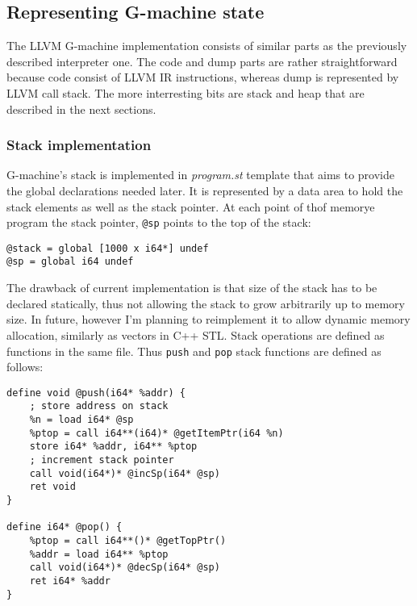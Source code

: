 \documentclass[12pt,a4paper]{report}
\begin{document}
\subsection{Representing G-machine state}
The LLVM G-machine implementation consists of similar parts as the previously
described interpreter one. The code and dump parts are rather straightforward
because code consist of LLVM IR instructions, whereas dump is represented by
LLVM call stack. The more interresting bits are stack and heap that are
described in the next sections.

\subsubsection{Stack implementation}
G-machine's stack is implemented in \textit{program.st}
template that aims to provide the global declarations needed later. It is
represented by a data area to hold the stack elements as well as the stack
pointer. At each point of thof memorye program the stack pointer, \texttt{@sp} points to
the top of the stack:

\hspace*{-1.5in}
\begin{lstlisting}[style=assembler]
@stack = global [1000 x i64*] undef
@sp = global i64 undef
\end{lstlisting}

The drawback of current implementation is that size of the stack has to be
declared statically, thus not allowing the stack to grow arbitrarily up to
memory size. In future, however I'm planning to reimplement it to allow dynamic
memory allocation, similarly as vectors in C++ STL. Stack operations are
defined as functions in the same file. Thus \texttt{push} and \texttt{pop}
stack functions are defined as follows:

\hspace*{-1.5in}
\begin{lstlisting}[style=assembler,caption={\texttt{push} and \texttt{pop} operations on the
  LLVM stack.}]
define void @push(i64* %addr) {
    ; store address on stack
    %n = load i64* @sp
    %ptop = call i64**(i64)* @getItemPtr(i64 %n)
    store i64* %addr, i64** %ptop
    ; increment stack pointer
    call void(i64*)* @incSp(i64* @sp)
    ret void
}

define i64* @pop() {
    %ptop = call i64**()* @getTopPtr()
    %addr = load i64** %ptop
    call void(i64*)* @decSp(i64* @sp)
    ret i64* %addr
}
\end{lstlisting}
\end{document}
